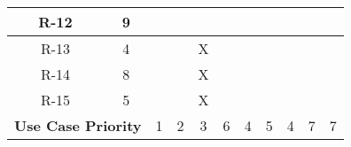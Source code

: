 \documentclass[12pt,a4paper]{article}
\begin{document}
\begin{table}[h!]
\begin{tabular}{cc|c|c|c|c|c|c|c|c|c|}
					\multicolumn{1}{|c|}{R-12}                 & 9                 &     &      &      &      &     &   &  &   &     				\\ \hline
					\multicolumn{1}{|c|}{R-13}                 & 4                 &     &      & X    &      &     &   &  &   &      				\\ \hline
					\multicolumn{1}{|c|}{R-14}                 & 8                 &     &      & X    &      &     &   &  &   &      				\\ \hline
					\multicolumn{1}{|c|}{R-15}                 & 5                 &     &      & X    &      &     &   &  &   &     				\\ \hline
					\multicolumn{2}{|c|}{\textbf{Use Case Priority}}               & 1    & 2    & 3    & 6    & 4    & 5 & 4 & 7  & 7			    \\ \hline
				\end{tabular}
			\end{table}
\end{document}
